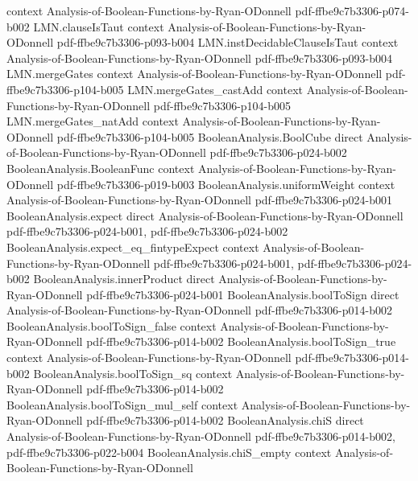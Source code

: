 \begin{theorem}
  {context}
  {Analysis-of-Boolean-Functions-by-Ryan-ODonnell}
  {pdf-ffbe9c7b3306-p074-b002}
\proofstep
  {LMN.clauseIsTaut}
  {context}
  {Analysis-of-Boolean-Functions-by-Ryan-ODonnell}
  {pdf-ffbe9c7b3306-p093-b004}
\proofstep
  {LMN.instDecidableClauseIsTaut}
  {context}
  {Analysis-of-Boolean-Functions-by-Ryan-ODonnell}
  {pdf-ffbe9c7b3306-p093-b004}
\proofstep
  {LMN.mergeGates}
  {context}
  {Analysis-of-Boolean-Functions-by-Ryan-ODonnell}
  {pdf-ffbe9c7b3306-p104-b005}
\proofstep
  {LMN.mergeGates_castAdd}
  {context}
  {Analysis-of-Boolean-Functions-by-Ryan-ODonnell}
  {pdf-ffbe9c7b3306-p104-b005}
\proofstep
  {LMN.mergeGates_natAdd}
  {context}
  {Analysis-of-Boolean-Functions-by-Ryan-ODonnell}
  {pdf-ffbe9c7b3306-p104-b005}
\proofstep
  {BooleanAnalysis.BoolCube}
  {direct}
  {Analysis-of-Boolean-Functions-by-Ryan-ODonnell}
  {pdf-ffbe9c7b3306-p024-b002}
\proofstep
  {BooleanAnalysis.BooleanFunc}
  {context}
  {Analysis-of-Boolean-Functions-by-Ryan-ODonnell}
  {pdf-ffbe9c7b3306-p019-b003}
\proofstep
  {BooleanAnalysis.uniformWeight}
  {context}
  {Analysis-of-Boolean-Functions-by-Ryan-ODonnell}
  {pdf-ffbe9c7b3306-p024-b001}
\proofstep
  {BooleanAnalysis.expect}
  {direct}
  {Analysis-of-Boolean-Functions-by-Ryan-ODonnell}
  {pdf-ffbe9c7b3306-p024-b001,
    pdf-ffbe9c7b3306-p024-b002}
\proofstep
  {BooleanAnalysis.expect_eq_fintypeExpect}
  {context}
  {Analysis-of-Boolean-Functions-by-Ryan-ODonnell}
  {pdf-ffbe9c7b3306-p024-b001,
    pdf-ffbe9c7b3306-p024-b002}
\proofstep
  {BooleanAnalysis.innerProduct}
  {direct}
  {Analysis-of-Boolean-Functions-by-Ryan-ODonnell}
  {pdf-ffbe9c7b3306-p024-b001}
\proofstep
  {BooleanAnalysis.boolToSign}
  {direct}
  {Analysis-of-Boolean-Functions-by-Ryan-ODonnell}
  {pdf-ffbe9c7b3306-p014-b002}
\proofstep
  {BooleanAnalysis.boolToSign_false}
  {context}
  {Analysis-of-Boolean-Functions-by-Ryan-ODonnell}
  {pdf-ffbe9c7b3306-p014-b002}
\proofstep
  {BooleanAnalysis.boolToSign_true}
  {context}
  {Analysis-of-Boolean-Functions-by-Ryan-ODonnell}
  {pdf-ffbe9c7b3306-p014-b002}
\proofstep
  {BooleanAnalysis.boolToSign_sq}
  {context}
  {Analysis-of-Boolean-Functions-by-Ryan-ODonnell}
  {pdf-ffbe9c7b3306-p014-b002}
\proofstep
  {BooleanAnalysis.boolToSign_mul_self}
  {context}
  {Analysis-of-Boolean-Functions-by-Ryan-ODonnell}
  {pdf-ffbe9c7b3306-p014-b002}
\proofstep
  {BooleanAnalysis.chiS}
  {direct}
  {Analysis-of-Boolean-Functions-by-Ryan-ODonnell}
  {pdf-ffbe9c7b3306-p014-b002,
    pdf-ffbe9c7b3306-p022-b004}
\proofstep
  {BooleanAnalysis.chiS_empty}
  {context}
  {Analysis-of-Boolean-Functions-by-Ryan-ODonnell}

\end{theorem}

